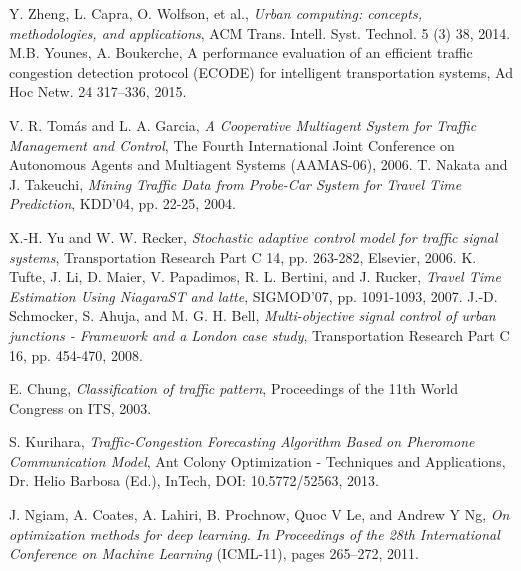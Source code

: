 \documentclass[a4paper,12pt]{article}
\begin{document}
\begin{thebibliography}{4}
 Y. Zheng, L. Capra, O. Wolfson, et al., \textit{Urban computing: concepts, methodologies,
and applications}, ACM Trans. Intell. Syst. Technol. 5 (3) 38, 2014.
 M.B. Younes, A. Boukerche, A performance evaluation of an efficient traffic
congestion detection protocol (ECODE) for intelligent transportation systems,
Ad Hoc Netw. 24 317–336, 2015.

 V. R. Tomás and L. A. Garcia, \textit{A Cooperative Multiagent System for Traffic Management
and Control}, The Fourth International Joint Conference on Autonomous Agents and
Multiagent Systems (AAMAS-06), 2006.
 T. Nakata and J. Takeuchi, \textit{Mining Traffic Data from Probe-Car System for Travel Time
Prediction}, KDD’04, pp. 22-25, 2004.

 X.-H. Yu and W. W. Recker, \textit{Stochastic adaptive control model for traffic signal systems},
Transportation Research Part C 14, pp. 263-282, Elsevier, 2006.
 K. Tufte, J. Li, D. Maier, V. Papadimos, R. L. Bertini, and J. Rucker, \textit{Travel Time
Estimation Using NiagaraST and latte}, SIGMOD’07, pp. 1091-1093, 2007.
 J.-D. Schmocker, S. Ahuja, and M. G. H. Bell, \textit{Multi-objective signal control of urban
junctions - Framework and a London case study}, Transportation Research Part C 16, pp.
454-470, 2008.

 E. Chung, \textit{Classification of traffic pattern}, Proceedings of the 11th World Congress on
ITS, 2003.

S. Kurihara, \textit{Traffic-Congestion Forecasting Algorithm Based on Pheromone Communication Model}, Ant Colony Optimization - Techniques and Applications, Dr. Helio Barbosa (Ed.), InTech, DOI: 10.5772/52563, 2013.


J. Ngiam, A. Coates, A. Lahiri, B. Prochnow, Quoc V Le, and Andrew Y Ng, \textit{On optimization methods
for deep learning. In Proceedings of the 28th International Conference on Machine Learning} (ICML-11), pages 265–272,
2011.


\end{thebibliography}
\end{document}
